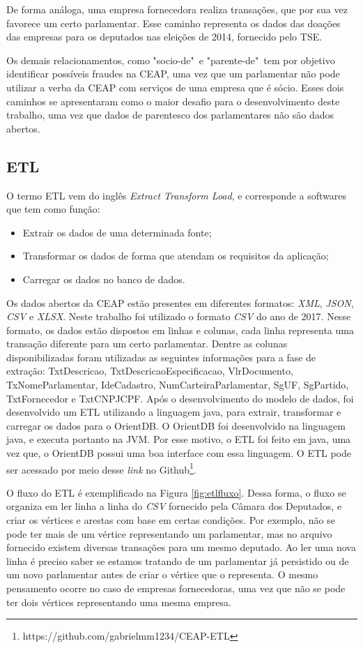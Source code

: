 De forma análoga, uma empresa fornecedora realiza transações, que por sua vez favorece um certo parlamentar. Esse caminho representa os dados das doações das empresas para os deputados nas eleições de 2014, fornecido pelo TSE. 

Os demais relacionamentos, como "socio-de"\ e "parente-de"\ tem por objetivo identificar possíveis fraudes na CEAP, uma vez que um parlamentar não pode utilizar a verba da CEAP com serviços de uma empresa que é sócio. Esses dois caminhos se apresentaram como o maior desafio para o desenvolvimento deste trabalho, uma vez que dados de parentesco dos parlamentares não são dados abertos.

\subsection{ETL} \label{etl-subsection}

	O termo ETL vem do inglês \textit{Extract Transform Load}, e corresponde a softwares que tem como função:
\begin{itemize}
		\item Extrair os dados de uma determinada fonte;
		\item Transformar os dados de forma que atendam os requisitos da aplicação;
		\item Carregar os dados no banco de dados.
\end{itemize}
	
	Os dados abertos da CEAP estão presentes em diferentes formatos: \textit{XML}, \textit{JSON}, \textit{CSV} e \textit{XLSX}. Neste trabalho foi utilizado o formato \textit{CSV} do ano de 2017. Nesse formato, os dados estão dispostos em linhas e colunas, cada linha representa uma transação diferente para um certo parlamentar. Dentre as colunas disponibilizadas foram utilizadas as seguintes informações para a fase de extração: TxtDescricao, TxtDescricaoEspecificacao, VlrDocumento, TxNomeParlamentar, IdeCadastro, NumCarteiraParlamentar, SgUF, SgPartido, TxtFornecedor e TxtCNPJCPF. Após o desenvolvimento do modelo de dados, foi desenvolvido um ETL utilizando a linguagem java, para extrair, transformar e carregar os dados para o OrientDB. O OrientDB foi desenvolvido na linguagem java, e executa portanto na JVM. Por esse motivo, o ETL foi feito em java, uma vez que, o OrientDB possui uma boa interface com essa linguagem. O ETL pode ser acessado por meio desse \textit{link} no Github\footnote{https://github.com/gabrielmm1234/CEAP-ETL}.
	
	O fluxo do ETL é exemplificado na Figura \ref{fig:etlfluxo}. Dessa forma, o fluxo se organiza em ler linha a linha do \textit{CSV} fornecido pela Câmara dos Deputados, e criar os vértices e arestas com base em certas condições. Por exemplo, não se pode ter mais de um vértice representando um parlamentar, mas no arquivo fornecido existem diversas transações para um mesmo deputado. Ao ler uma nova linha é preciso saber se estamos tratando de um parlamentar já persistido ou de um novo parlamentar antes de criar o vértice que o representa. O mesmo pensamento ocorre no caso de empresas fornecedoras, uma vez que não se pode ter dois vértices representando uma mesma empresa.
	

